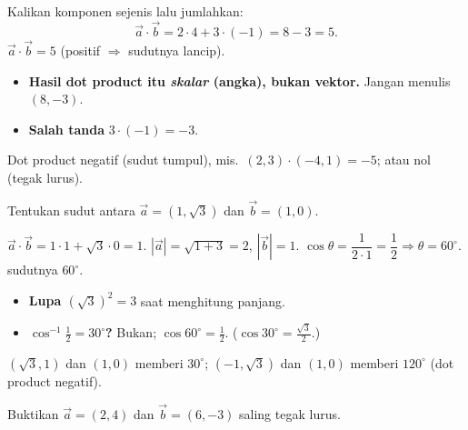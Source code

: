 \jawab
{} Kalikan komponen sejenis lalu jumlahkan:
\[
\vec a\cdot\vec b=2\cdot4+3\cdot(-1)=8-3=5.
\]
\jadi $\vec a\cdot\vec b=5$ (positif $\Rightarrow$ sudutnya lancip).

\begin{jebakan}
\begin{itemize}[leftmargin=*,topsep=2pt]
  \item \textbf{Hasil dot product itu \emph{skalar} (angka), bukan vektor.}
  Jangan menulis $(8,-3)$.
  \item \textbf{Salah tanda} $3\cdot(-1)=-3$.
\end{itemize}
\end{jebakan}

\begin{variasi}
Dot product negatif (sudut tumpul), mis.\ $(2,3)\cdot(-4,1)=-5$; atau nol
(tegak lurus).
\end{variasi}

\begin{soalbox}{}
Tentukan sudut antara $\vec a=(1,\sqrt3)$ dan $\vec b=(1,0)$.
\end{soalbox}

\jawab
{} $\vec a\cdot\vec b=1\cdot1+\sqrt3\cdot0=1$.
 $|\vec a|=\sqrt{1+3}=2$, $|\vec b|=1$.
 $\cos\theta=\dfrac{1}{2\cdot1}=\dfrac12\Rightarrow\theta=60^\circ$.
\jadi sudutnya $60^\circ$.

\begin{jebakan}
\begin{itemize}[leftmargin=*,topsep=2pt]
  \item \textbf{Lupa $(\sqrt3)^2=3$} saat menghitung panjang.
  \item \textbf{$\cos^{-1}\tfrac12=30^\circ$?} Bukan; $\cos60^\circ=\frac12$.
  ($\cos30^\circ=\frac{\sqrt3}{2}$.)
\end{itemize}
\end{jebakan}

\begin{variasi}
$(\sqrt3,1)$ dan $(1,0)$ memberi $30^\circ$; $(-1,\sqrt3)$ dan $(1,0)$ memberi
$120^\circ$ (dot product negatif).
\end{variasi}

\begin{soalbox}{}
Buktikan $\vec a=(2,4)$ dan $\vec b=(6,-3)$ saling tegak lurus.
\end{soalbox}

